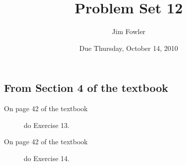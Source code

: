 \documentclass[12pt]{handout}
\author{Jim Fowler}
\title{Problem Set 12}
\date{Due Thursday, October 14, 2010}
\begin{document}
\maketitle










\subsection*{From Section 4 of the textbook}



\begin{description}

\item[On page 42 of the textbook] do Exercise 13.

\item[On page 42 of the textbook] do Exercise 14.

\end{description}
\end{document}

